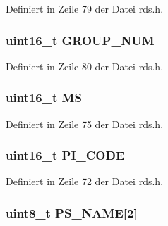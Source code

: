 Definiert in Zeile 79 der Datei rds.\+h.

\hypertarget{structgroup__0b_a9f692e9f76ee88348d426bcd4e9bc70b}{}
\subsubsection[{G\+R\+O\+U\+P\+\_\+\+N\+U\+M}]{\setlength{\rightskip}{0pt plus 5cm}uint16\+\_\+t G\+R\+O\+U\+P\+\_\+\+N\+U\+M}\label{structgroup__0b_a9f692e9f76ee88348d426bcd4e9bc70b}


Definiert in Zeile 80 der Datei rds.\+h.

\hypertarget{structgroup__0b_a0d87191040df43fdd9f67487d0cc1a45}{}
\subsubsection[{M\+S}]{\setlength{\rightskip}{0pt plus 5cm}uint16\+\_\+t M\+S}\label{structgroup__0b_a0d87191040df43fdd9f67487d0cc1a45}


Definiert in Zeile 75 der Datei rds.\+h.

\hypertarget{structgroup__0b_a5cd9b1f6413028425796c1129aa8fd87}{}
\subsubsection[{P\+I\+\_\+\+C\+O\+D\+E}]{\setlength{\rightskip}{0pt plus 5cm}uint16\+\_\+t P\+I\+\_\+\+C\+O\+D\+E}\label{structgroup__0b_a5cd9b1f6413028425796c1129aa8fd87}


Definiert in Zeile 72 der Datei rds.\+h.

\hypertarget{structgroup__0b_a80447425671c19133df16d620705bb09}{}
\subsubsection[{P\+S\+\_\+\+N\+A\+M\+E}]{\setlength{\rightskip}{0pt plus 5cm}uint8\+\_\+t P\+S\+\_\+\+N\+A\+M\+E\mbox{[}2\mbox{]}}\label{structgroup__0b_a80447425671c19133df16d620705bb09}


